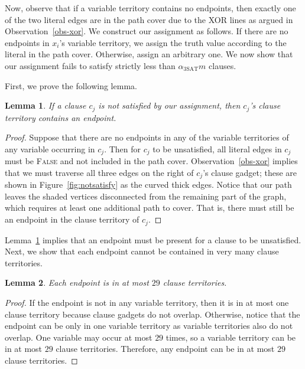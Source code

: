 \documentclass[11pt]{article}
\newtheorem{lemma}{Lemma}
\def\SAT{\mathrm{3SAT}}
\begin{document}
Now, observe that if a variable territory contains no endpoints, then exactly one of the two literal edges are in the path cover due to the XOR lines as argued in Observation~\ref{obs-xor}. We construct our assignment as follows. If there are no endpoints in $x_i$'s variable territory, we assign the truth value according to the literal in the path cover. Otherwise, assign an arbitrary one. We now show that our assignment fails to satisfy strictly less than $\alpha_{\SAT} m$ clauses.

First, we prove the following lemma.

\begin{lemma} \label{lemma-clause-endpoint}
If a clause $c_j$ is not satisfied by our assignment, then $c_j$'s clause territory contains an endpoint.
\end{lemma}
\begin{proof}
Suppose that there are no endpoints in any of the variable territories of any variable occurring in $c_j$. Then for $c_j$ to be unsatisfied, all literal edges in $c_j$ must be \textsc{False} and not included in the path cover. Observation~\ref{obs-xor} implies that we must traverse all three edges on the right of $c_j$'s clause gadget; these are shown in Figure~\ref{fig:notsatisfy} as the curved thick edges. Notice that our path leaves the shaded vertices disconnected from the remaining part of the graph, which requires at least one additional path to cover. That is, there must still be an endpoint in the clause territory of $c_j$.
\end{proof}

Lemma~\ref{lemma-clause-endpoint} implies that an endpoint must be present for a clause to be unsatisfied. Next, we show that each endpoint cannot be contained in very many clause territories.

\begin{lemma}
Each endpoint is in at most $29$ clause territories.
\end{lemma}
\begin{proof}
If the endpoint is not in any variable territory, then it is in at most one clause territory because clause gadgets do not overlap. Otherwise, notice that the endpoint can be only in one variable territory as variable territories also do not overlap. One variable may occur at most $29$ times, so a variable territory can be in at most $29$ clause territories. Therefore, any endpoint can be in at most $29$ clause territories.
\end{proof}
\end{document}
